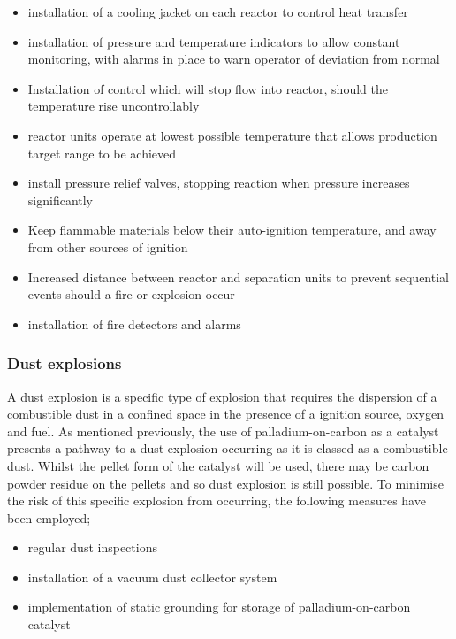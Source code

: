 \begin{itemize}
    \item installation of a cooling jacket on each reactor to control heat transfer
    \item installation of pressure and temperature indicators to allow constant monitoring, with alarms in place to warn operator of deviation from normal
    \item Installation of control which will stop flow into reactor, should the temperature rise uncontrollably
    \item reactor units operate at lowest possible temperature that allows production target range to be achieved
    \item install pressure relief valves, stopping reaction when pressure increases significantly 
    \item Keep flammable materials below their auto-ignition temperature, and away from other sources of ignition
    \item Increased distance between reactor and separation units to prevent sequential events should a fire or explosion occur
    \item installation of fire detectors and alarms
    
\end{itemize}


\subsubsection{Dust explosions}

A dust explosion is a specific type of explosion that requires the dispersion of a combustible dust in a confined space in the presence of a ignition source, oxygen and fuel. As mentioned previously, the use of palladium-on-carbon as a catalyst presents a pathway to a dust explosion occurring as it is classed as a combustible dust. Whilst the pellet form of the catalyst will be used, there may be carbon powder residue on the pellets and so dust explosion is still possible. To minimise the risk of this specific explosion from occurring, the following measures have been employed;

\begin{itemize}
    \item regular dust inspections 
    \item installation of a vacuum dust collector system 
    \item implementation of static grounding for storage of palladium-on-carbon catalyst  
\end{itemize}


